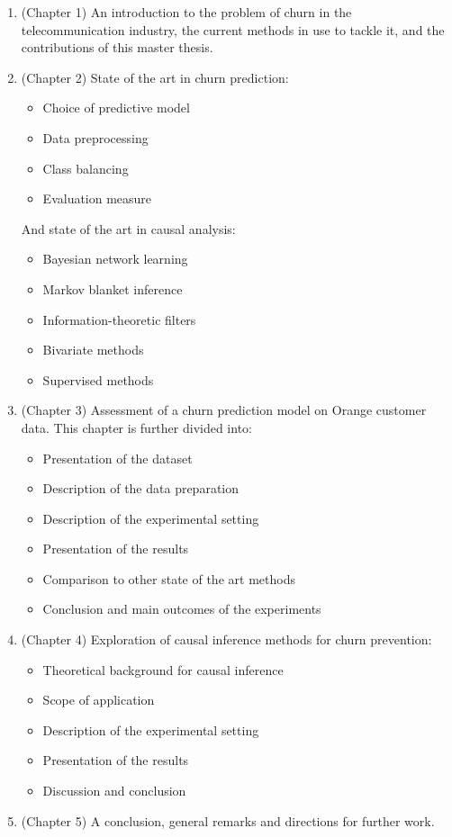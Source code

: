 \begin{enumerate}
	\item (Chapter 1) An introduction to the problem of churn in the
	telecommunication industry, the current methods in use to tackle it, and the
	contributions of this master thesis.

    \item (Chapter 2) State of the art in churn prediction:
    \begin{itemize}
        \item Choice of predictive model
        \item Data preprocessing
        \item Class balancing
        \item Evaluation measure
    \end{itemize}
    And state of the art in causal analysis:
    \begin{itemize}
        \item Bayesian network learning
        \item Markov blanket inference
        \item Information-theoretic filters
        \item Bivariate methods
        \item Supervised methods
    \end{itemize}

	\item (Chapter 3) Assessment of a churn prediction model on Orange customer
	data. This chapter is further divided into:
	\begin{itemize}
		\item Presentation of the dataset
		\item Description of the data preparation
		\item Description of the experimental setting
		\item Presentation of the results
        \item Comparison to other state of the art methods
		\item Conclusion and main outcomes of the experiments
	\end{itemize}

    \item (Chapter 4) Exploration of causal inference methods for churn
    prevention:
    \begin{itemize}
        \item Theoretical background for causal inference
        \item Scope of application
        \item Description of the experimental setting
        \item Presentation of the results
        \item Discussion and conclusion
    \end{itemize}

    \item (Chapter 5) A conclusion, general remarks and directions for further work.
\end{enumerate}


